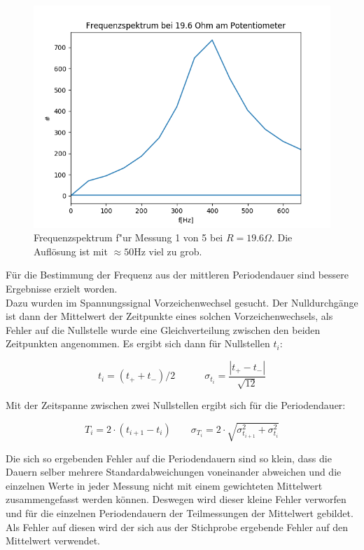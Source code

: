\documentclass[12pt,a4paper]{article}
\begin{document}
\begin{figure}
\begin{center}
\includegraphics[scale=0.75]{Bilder/fft_19,6Ohm}
\end{center}
\caption{Frequenzspektrum f"ur Messung 1 von 5 bei $R=19.6 \Omega$. Die Auflösung ist mit $\approx 50$Hz viel zu grob.}
\label{fig:Fourier19,6}
\end{figure}

Für die Bestimmung der Frequenz aus der mittleren Periodendauer sind bessere Ergebnisse erzielt worden.\\
Dazu wurden im Spannungssignal Vorzeichenwechsel gesucht. Der Nulldurchgänge ist dann der Mittelwert der Zeitpunkte eines solchen Vorzeichenwechsels, als Fehler auf die Nullstelle wurde eine Gleichverteilung zwischen den beiden Zeitpunkten angenommen. Es ergibt sich dann für Nullstellen $t_i$:

\begin{equation}
t_i=(t_++t_-)/2 \quad \quad \quad
\sigma_{t_i}=\frac{|t_+-t_-|}{\sqrt{12}}
\end{equation}

Mit der Zeitspanne zwischen zwei Nullstellen ergibt sich für die Periodendauer:

\begin{equation}
T_i=2\cdot (t_{i+1}-t_i) \quad \quad
\sigma_{T_i}=2\cdot \sqrt{\sigma_{t_{i+1}}^2+\sigma_{t_i}^2}
\end{equation}

Die sich so ergebenden Fehler auf die Periodendauern sind so klein, dass die Dauern selber mehrere Standardabweichungen voneinander abweichen und die einzelnen Werte in jeder Messung nicht mit einem gewichteten Mittelwert zusammengefasst werden können. Deswegen wird dieser kleine Fehler verworfen und für die einzelnen Periodendauern der Teilmessungen der Mittelwert gebildet. Als Fehler auf diesen wird der sich aus der Stichprobe ergebende Fehler auf den Mittelwert verwendet.\\
\end{document}

